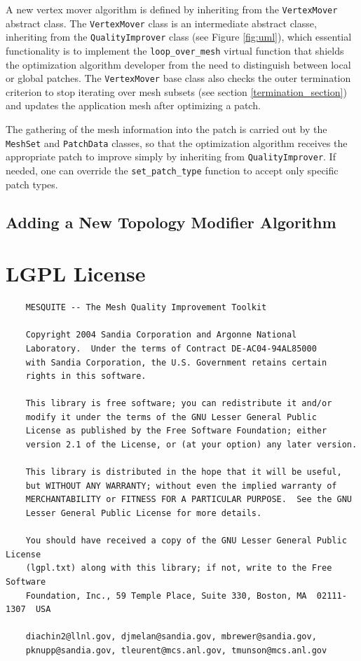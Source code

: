 \documentclass[letter]{report}
\begin{document}
A new vertex mover algorithm is defined by inheriting from the
\texttt{VertexMover} abstract class. The \texttt{VertexMover} class 
is an intermediate abstract classe, inheriting from the
\texttt{QualityImprover} class (see Figure \ref{fig:uml}),  which
essential functionality is to implement the \texttt{loop\_over\_mesh}
virtual function that shields the optimization algorithm developer
from the need to distinguish between local or global patches.  The
\texttt{VertexMover} base class also checks the outer termination
criterion to stop iterating over mesh subsets (see section
\ref{termination_section}) and updates the application mesh after
optimizing a patch.

The
gathering of the mesh information into the patch is
carried out by the \texttt{MeshSet} and \texttt{PatchData} classes, so that the
optimization algorithm receives the appropriate patch to improve
simply by inheriting from \texttt{QualityImprover}.  If needed, one can 
override the \texttt{set\_patch\_type} function to accept only specific
patch types.

\subsection{Adding a New Topology Modifier Algorithm}

\section{LGPL License}
\begin{verbatim}
    MESQUITE -- The Mesh Quality Improvement Toolkit
 
    Copyright 2004 Sandia Corporation and Argonne National
    Laboratory.  Under the terms of Contract DE-AC04-94AL85000
    with Sandia Corporation, the U.S. Government retains certain
    rights in this software.
 
    This library is free software; you can redistribute it and/or
    modify it under the terms of the GNU Lesser General Public
    License as published by the Free Software Foundation; either
    version 2.1 of the License, or (at your option) any later version.
 
    This library is distributed in the hope that it will be useful,
    but WITHOUT ANY WARRANTY; without even the implied warranty of
    MERCHANTABILITY or FITNESS FOR A PARTICULAR PURPOSE.  See the GNU
    Lesser General Public License for more details.
 
    You should have received a copy of the GNU Lesser General Public License
    (lgpl.txt) along with this library; if not, write to the Free Software
    Foundation, Inc., 59 Temple Place, Suite 330, Boston, MA  02111-1307  USA
  
    diachin2@llnl.gov, djmelan@sandia.gov, mbrewer@sandia.gov,
    pknupp@sandia.gov, tleurent@mcs.anl.gov, tmunson@mcs.anl.gov
    
\end{verbatim}
\end{document}
